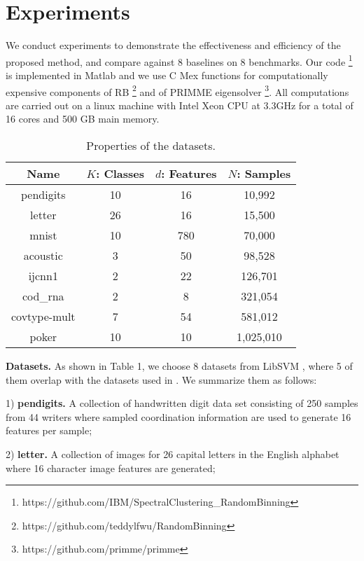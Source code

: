 \documentclass[sigconf]{acmart}
\newcommand{\1}{\boldsymbol{1}}
\newcommand{\0}{\boldsymbol{0}}
\begin{document}
\section{Experiments}
We conduct experiments to demonstrate the effectiveness and efficiency of the proposed method, and compare against 8 baselines on 8 benchmarks. Our code \footnote{https://github.com/IBM/SpectralClustering\_RandomBinning} is implemented in Matlab and we use C Mex functions for computationally expensive components of RB \footnote{https://github.com/teddylfwu/RandomBinning} and of PRIMME eigensolver \footnote{https://github.com/primme/primme}. All computations are carried out on a linux machine with Intel Xeon CPU at 3.3GHz for a total of 16 cores and 500 GB main memory. 
\begin{table}[htbp]
\centering
\caption{Properties of the datasets.} 
\vspace{0mm}
\label{tb: info of datasets}
\begin{center}
    \begin{tabular}{ c c c c}
    \hline
    Name 		 & $K$: Classes & $d$: Features & $N$: Samples \\ \hline 
    pendigits 	 & 10  & 16  & 10,992 \\
    letter       & 26 & 16 & 15,500 \\
    mnist        & 10 & 780 & 70,000  \\ 
    acoustic     & 3  & 50 & 98,528  \\ 
    ijcnn1 		 & 2  & 22  & 126,701 \\ 
    cod\_rna     & 2  & 8  & 321,054  \\
    covtype-mult & 7  & 54 & 581,012 \\ 
    poker        & 10 & 10 & 1,025,010 \\ \hline
    \end{tabular}
\end{center}
\end{table}

\textbf{Datasets.} As shown in Table 1, we choose 8 datasets from LibSVM \cite{chang2011libsvm}, where 5 of them overlap with the datasets used in \cite{yan2009fast,li2016scalable,chen2011large}. We summarize them as follows:

1) \textbf{pendigits.} A collection of handwritten digit data set consisting of 250 samples from 44 writers where sampled coordination information are used to generate 16 features per sample;

2) \textbf{letter.} A collection of images for 26 capital letters in the English alphabet where 16 character image features are generated; 
\end{document}
